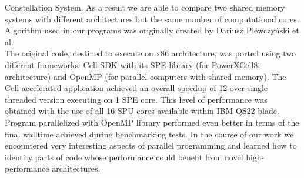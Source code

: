 \documentclass[envcountsame,envcountchap]{svmono}
\begin{document}
Constellation System.
As a result we are able to compare two shared memory systems with different
architectures but the same number of computational cores.
Algorithm used in our programs  was originally created by Dariusz Plewczy\'nski
et al. \cite{3dhit1,3dhit2}\\
The original code, destined to execute on x86 architecture, was ported using two
different frameworks: Cell SDK with its SPE library (for PowerXCell8i
architecture) and OpenMP (for parallel computers with shared memory).
The Cell-accelerated application achieved an overall speedup of 12 over
single threaded version executing on 1 SPE core.
This level of performance was obtained with the use of all 16 SPU cores
available within IBM QS22 blade.
Program parallelized with OpenMP library performed even better in terms of the
final walltime achieved during benchmarking tests.
In the course of our work we encountered very interesting aspects of parallel
programming and learned how to identity parts of code whose performance
could benefit from novel high-performance architectures.

\end{document}
